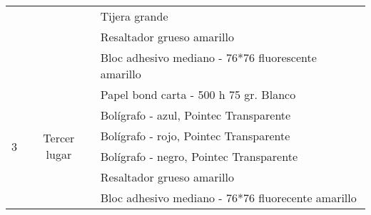 \documentclass{article}
\begin{document}
\begin{table}[htbp]
{\begin{tabular}{|c|c|l|}
\cmidrule{3-3}          &       & Tijera grande \\
\cmidrule{3-3}          &       & Resaltador grueso amarillo \\
\cmidrule{3-3}          &       & Bloc adhesivo mediano - 76*76 fluorescente amarillo \\
    \midrule
    \multirow{6}[12]{*}{3} & \multirow{6}[12]{*}{Tercer lugar} & Papel bond carta - 500 h 75 gr. Blanco \\
\cmidrule{3-3}          &       & Bolígrafo - azul, Pointec Transparente \\
\cmidrule{3-3}          &       & Bolígrafo - rojo, Pointec Transparente \\
\cmidrule{3-3}          &       & Bolígrafo - negro, Pointec Transparente \\
\cmidrule{3-3}          &       & Resaltador grueso amarillo \\
\cmidrule{3-3}          &       & Bloc adhesivo mediano - 76*76 fluorecente amarillo \\
    \bottomrule
    \end{tabular}}%
  \label{tab:addlabel}%
\end{table}

\newpage



\newpage


\end{document}
